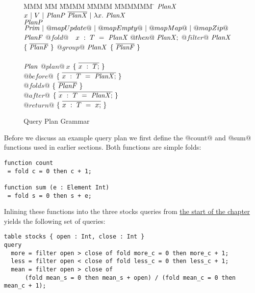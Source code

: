 \begin{figure}

\begin{tabbing}
MMM \= MM \= MMMM \= MMMM \= MMMMMM \= \kill
$\mathit{PlanX}$
\GrammarDefTab
  $x~|~V~|~\mathit{PlanP}~\overline{\mathit{PlanX}}~|~\lambda{}x.~\mathit{PlanX}$
\\
$\mathit{PlanP}$
\GrammarDefTab
  $\mathit{Prim}~|~@mapUpdate@~|~@mapEmpty@~|~@mapMap@~|~@mapZip@$
\\
$\mathit{PlanF}$
\GrammarDefTab
 $@fold@$ \> $~~x~:~T~=~\mathit{PlanX}~@then@~\mathit{PlanX};$
\GrammarAlt
 $@filter@$ \> $\mathit{PlanX}$ \> $\{~\overline{\mathit{PlanF}}~\}$
\GrammarAlt
  $@group@$ \> $\mathit{PlanX}$ \> $\{~\overline{\mathit{PlanF}}~\}$
\\
\\
$\mathit{Plan}$
\GrammarDefTab
  $@plan@~x$ \> $\{~\overline{x~:~T;}~\}$
\\
  \> \> $@before@$ \> $\{~\overline{x~:~T~=~\mathit{PlanX};}~\}$ \\
  \> \> $@folds@$  \> $\{~\overline{\mathit{PlanF}}~\}$ \\
  \> \> $@after@$  \> $\{~\overline{x~:~T~=~\mathit{PlanX};}~\}$ \\
  \> \> $@return@$ \> $\{~\overline{x~:~T~=~x;}~\}$ \\
\end{tabbing}



\caption{Query Plan Grammar}
\label{icicle:fig:core:grammar}
\end{figure}


Before we discuss an example query plan we first define the @count@ and @sum@ functions used in earlier sections.
Both functions are simple folds:
\begin{lstlisting}
function count
 = fold c = 0 then c + 1;

function sum (e : Element Int)
 = fold s = 0 then s + e;
\end{lstlisting}

Inlining these functions into the three stocks queries from \hyperref[icicle:s:Introduction]{the start of the chapter} yields the following set of queries:

\begin{lstlisting}
table stocks { open : Int, close : Int }
query 
  more = filter open > close of fold more_c = 0 then more_c + 1;
  less = filter open < close of fold less_c = 0 then less_c + 1;
  mean = filter open > close of
      (fold mean_s = 0 then mean_s + open) / (fold mean_c = 0 then mean_c + 1);
\end{lstlisting}

